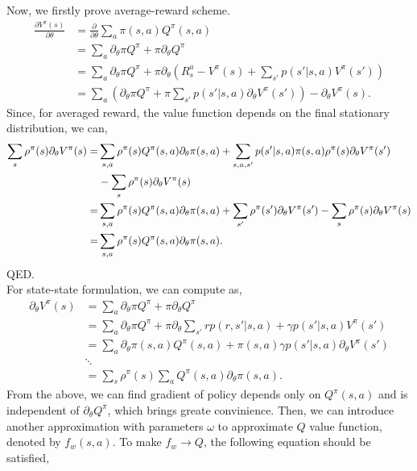 \documentclass[11pt,a4paper]{article}
\begin{document}
Now, we firstly prove average-reward scheme.
\begin{align}
\frac{\partial V^{\pi}(s)}{\partial \theta} & = \frac{\partial}{\partial \theta}\sum_a \pi(s,a)Q^{\pi}(s,a) \\ 
& = \sum_a \partial_{\theta}\pi Q^{\pi} + \pi \partial_{\theta}Q^{\pi} \\ 
& = \sum_a \partial_{\theta}\pi Q^{\pi} + \pi \partial_{\theta}\left(R_{s}^a - V^{\pi}(s)+\sum_{s'}p(s'|s,a)V^{\pi}(s')\right)\\ 
& = \sum_{a}\left(\partial_{\theta}\pi Q^{\pi} + \pi\sum_{s'}p(s'|s,a)\partial_{\theta}V^{\pi}(s')\right) - \partial_{\theta}V^{\pi}(s).
\end{align}
Since, for averaged reward, the value function depends on the final stationary distribution, we can,
\begin{equation}
\aligned
\sum_{s}\rho^{\pi}(s)\partial_{\theta}V^{\pi}(s) = &\sum_{s,a}\rho^{\pi}(s)Q^{\pi}(s,a)\partial_{\theta}\pi(s,a) + \sum_{s,a,s'}p(s'|s,a)\pi(s,a)\rho^{\pi}(s)\partial_{\theta}V^{\pi}(s')\\ & - \sum_{s}\rho^{\pi}(s)\partial_{\theta}V^{\pi}(s)\\ 
= & \sum_{s,a}\rho^{\pi}(s)Q^{\pi}(s,a)\partial_{\theta}\pi(s,a) + \sum_{s'}\rho^{\pi}(s')\partial_{\theta}V^{\pi}(s') - \sum_{s}\rho^{\pi}(s)\partial_{\theta} V^{\pi}(s)\\ 
= & \sum_{s,a}\rho^{\pi}(s)Q^{\pi}(s,a)\partial_{\theta}\pi(s,a).
\endaligned
\end{equation}
QED.\\ 
For state-state formulation, we can compute as,
\begin{align}
\partial_{\theta}V^{\pi}(s) & = \sum_{a}\partial_{\theta}\pi Q^{\pi} + \pi \partial_{\theta}Q^\pi \\ 
& = \sum_a \partial_{\theta}\pi Q^{\pi} + \pi \partial_{\theta}\sum_{s'}rp(r,s'|s,a)+\gamma p(s'|s,a)V^{\pi}(s')\\ 
& = \sum_a \partial_{\theta}\pi(s,a) Q^{\pi}(s,a) + \pi(s,a) \gamma p(s'|s,a)\partial_{\theta}V^{\pi}(s') \\ 
& \ddots \\ 
& = \sum_{s}\rho^{\pi}(s)\sum_{a}Q^{\pi}(s,a)\partial_{\theta}\pi(s,a).
\end{align}
From the above, we can find gradient of policy depends only on $Q^{\pi}(s,a)$ and is independent of $\partial_{\theta}Q^{\pi}$, which brings greate convinience. Then, we can introduce another approximation with parameters $\omega$ to approximate $Q$ value function, denoted by $f_{w}(s,a)$. To make $f_w \to Q$, the following equation should be satisfied,
\end{document}
